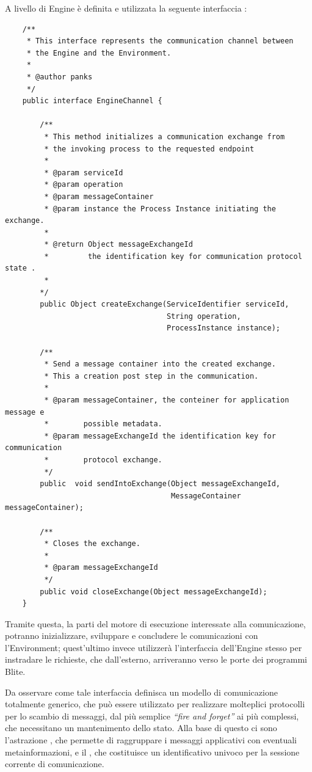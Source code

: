 \begin{enumerate}
  A livello di Engine è definita e utilizzata la seguente interfaccia
  :
	\begin{lstlisting}
	/**
	 * This interface represents the communication channel between 
 	 * the Engine and the Environment.  
 	 * 
 	 * @author panks
 	 */
	public interface EngineChannel {
		
   		/**
      	 * This method initializes a communication exchange from 
     	 * the invoking process to the requested endpoint
     	 * 
         * @param serviceId
     	 * @param operation
     	 * @param messageContainer
     	 * @param instance the Process Instance initiating the exchange.
     	 * 
     	 * @return Object messageExchangeId 
     	 *         the identification key for communication protocol state .
     	 *         
     	*/
     	public Object createExchange(ServiceIdentifier serviceId, 
        	                         String operation,
            	                     ProcessInstance instance);
   
    	/**
     	 * Send a message container into the created exchange. 
     	 * This a creation post step in the communication.
     	 * 
     	 * @param messageContainer, the conteiner for application message e
         *        possible metadata.
         * @param messageExchangeId the identification key for communication 
	     *        protocol exchange.
     	 */
    	public  void sendIntoExchange(Object messageExchangeId,
                                      MessageContainer messageContainer);

    	/**
     	 * Closes the exchange.
     	 * 
     	 * @param messageExchangeId
     	 */
    	public void closeExchange(Object messageExchangeId);
	}

  	\end{lstlisting} 

	Tramite questa, la parti del motore di esecuzione interessate alla
	comunicazione, potranno inizializzare, sviluppare e concludere le comunicazioni
	con l'Environment; quest'ultimo invece utilizzerà l'interfaccia dell'Engine
	stesso per instradare le richieste, che dall'esterno, arriveranno verso
	le porte dei programmi Blite.
	
	Da osservare come tale interfaccia definisca un modello di comunicazione
	totalmente generico, che può essere utilizzato per realizzare molteplici
	protocolli per lo scambio di messaggi, dal più semplice \emph{``fire and
	forget''} ai più complessi, che necessitano un mantenimento dello stato.
	Alla base di questo ci sono l'astrazione , che
	permette di raggruppare i messaggi applicativi con eventuali
	metainformazioni, e il , che costituisce un
	identificativo univoco per la sessione corrente di comunicazione.
	

\end{enumerate}
